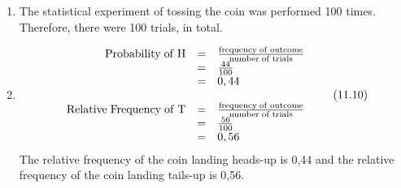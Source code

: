 {\begin{mdframed}[linewidth=4, leftmargin=40, rightmargin=40]
\begin{exercise}
\begin{enumerate}[noitemsep, label=\textbf{Step} \textbf{\arabic*}. ]
\begin{table}
\begin{center}
      \end{center}
    \begin{center}{\small\bfseries Table 11.4}\end{center}
    \begin{caption}{\small\bfseries Table 11.4}\end{caption}
\end{table}
    \par
      \item  
      \label{m39373*id113492}The statistical experiment of tossing the coin was
performed 100 times. Therefore, there were 100 trials, in total.\par 
      \item  
      \label{m39373*id113501}\nopagebreak\noindent{}
    \begin{equation}
    \begin{array}{ccc}\hfill \mathrm{Probability\; of\; H}& =& \frac{\mathrm{frequency\; of\; outcome}}{\mathrm{number\; of\; trials}}\hfill \\ & =& \frac{44}{100}\hfill \\ & =& 0,44\hfill \\ \\ \hfill \mathrm{Relative\; Frequency\; of\; T}& =& \frac{\mathrm{frequency\; of\; outcome}}{\mathrm{number\; of\; trials}}\hfill \\ & =& \frac{56}{100}\hfill \\ & =& 0,56\hfill \end{array}\tag{11.10}
      \end{equation}
      \label{m39373*id113660}The relative frequency of the coin landing heads-up is
0,44 and the relative frequency of the coin landing tails-up is 0,56. \par 
      \end{enumerate}
    \end{exercise}
    \end{mdframed}
    }
    \noindent
\label{m39373*secfhsst!!!underscore!!!id649}\vspace{.5cm} 
      \noindent
